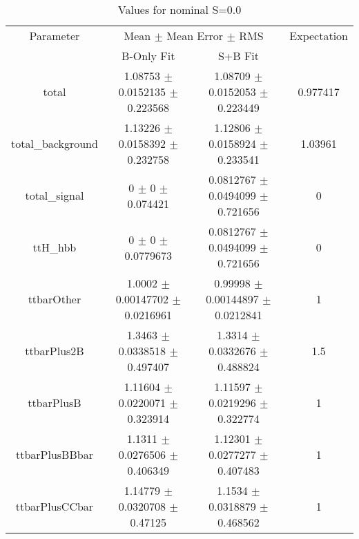 \begin{table}
\centering
\caption{Values for nominal S=0.0}
\begin{tabular}{cccc}
\toprule
Parameter & \multicolumn{2}{c}{Mean $\pm$ Mean Error $\pm$ RMS} & Expectation\\
 & B-Only Fit & S+B Fit & \\
\midrule
total & \num{1.08753} $\pm$ \num{0.0152135} $\pm$ \num{0.223568} & \num{1.08709} $\pm$ \num{0.0152053} $\pm$ \num{0.223449} & \num{0.977417}\\
total\_background & \num{1.13226} $\pm$ \num{0.0158392} $\pm$ \num{0.232758} & \num{1.12806} $\pm$ \num{0.0158924} $\pm$ \num{0.233541} & \num{1.03961}\\
total\_signal & \num{0} $\pm$ \num{0} $\pm$ \num{0.074421} & \num{0.0812767} $\pm$ \num{0.0494099} $\pm$ \num{0.721656} & \num{0}\\
ttH\_hbb & \num{0} $\pm$ \num{0} $\pm$ \num{0.0779673} & \num{0.0812767} $\pm$ \num{0.0494099} $\pm$ \num{0.721656} & \num{0}\\
ttbarOther & \num{1.0002} $\pm$ \num{0.00147702} $\pm$ \num{0.0216961} & \num{0.99998} $\pm$ \num{0.00144897} $\pm$ \num{0.0212841} & \num{1}\\
ttbarPlus2B & \num{1.3463} $\pm$ \num{0.0338518} $\pm$ \num{0.497407} & \num{1.3314} $\pm$ \num{0.0332676} $\pm$ \num{0.488824} & \num{1.5}\\
ttbarPlusB & \num{1.11604} $\pm$ \num{0.0220071} $\pm$ \num{0.323914} & \num{1.11597} $\pm$ \num{0.0219296} $\pm$ \num{0.322774} & \num{1}\\
ttbarPlusBBbar & \num{1.1311} $\pm$ \num{0.0276506} $\pm$ \num{0.406349} & \num{1.12301} $\pm$ \num{0.0277277} $\pm$ \num{0.407483} & \num{1}\\
ttbarPlusCCbar & \num{1.14779} $\pm$ \num{0.0320708} $\pm$ \num{0.47125} & \num{1.1534} $\pm$ \num{0.0318879} $\pm$ \num{0.468562} & \num{1}\\
\bottomrule
\end{tabular}
\end{table}